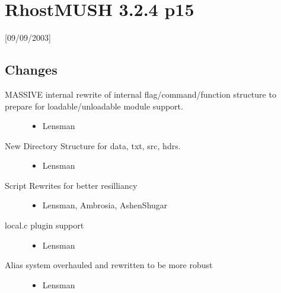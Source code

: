 \documentclass[letterpaper,10pt,english]{sphinxmanual}
\begin{document}
\section{RhostMUSH 3.2.4 p15}
\label{\detokenize{changelog:rhostmush-3-2-4-p15}}\label{\detokenize{changelog:changelog-3-2-4p15}}
\sphinxAtStartPar
{[}09/09/2003{]}


\subsection{Changes}
\label{\detokenize{changelog:id11}}\begin{description}
\item[{MASSIVE internal rewrite of internal flag/command/function structure to prepare for loadable/unloadable module support.}] \leavevmode\begin{itemize}
\item {} 
\sphinxAtStartPar
Lensman

\end{itemize}

\item[{New Directory Structure for data, txt, src, hdrs.}] \leavevmode\begin{itemize}
\item {} 
\sphinxAtStartPar
Lensman

\end{itemize}

\item[{Script Rewrites for better resilliancy}] \leavevmode\begin{itemize}
\item {} 
\sphinxAtStartPar
Lensman, Ambrosia, Ashen\sphinxhyphen{}Shugar

\end{itemize}

\item[{local.c plugin support}] \leavevmode\begin{itemize}
\item {} 
\sphinxAtStartPar
Lensman

\end{itemize}

\item[{Alias system overhauled and rewritten to be more robust}] \leavevmode\begin{itemize}
\item {} 
\sphinxAtStartPar
Lensman

\end{itemize}


\end{description}
\end{document}
